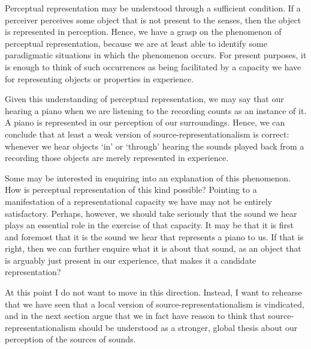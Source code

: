 \documentclass[sloppy, journal, git, bytitle, dodraft]{humapap}
\begin{document}

\sect Perceptual representation may be understood through a sufficient condition. If a perceiver perceives some object that is not present to the senses, then the object is represented in perception. Hence, we have a grasp on the phenomenon of perceptual representation, because we are at least able to identify some paradigmatic situations in which the phenomenon occurs. For present purposes, it is enough to think of such occurrences as being facilitated by a capacity we have for representing objects or properties in experience. 

Given this understanding of perceptual representation, we may say that our hearing a piano when we are listening to the recording counts as an instance of it. A piano is represented in our perception of our surroundings. Hence, we can conclude that at least a weak version of source-representationalism is correct: whenever we hear objects `in' or `through' hearing the sounds played back from a recording those objects are merely represented in experience. 

Some may be interested in enquiring into an explanation of this phenomenon. How is perceptual representation of this kind possible? Pointing to a manifestation of a representational capacity we have may not be entirely satisfactory. Perhaps, however, we should take seriously that the sound we hear plays an essential role in the exercise of that capacity. It may be that it is first and foremost that it is the sound we hear that represents a piano to us. If that is right, then we can further enquire what it is about that sound, as an object that is arguably just present in our experience, that makes it a candidate representation? 

At this point I do not want to move in this direction. Instead, I want to rehearse that we have seen that a local version of source-representationalism is vindicated, and in the next section argue that we in fact have reason to think that source-representationalism should be understood as a stronger, global thesis about our perception of the sources of sounds. 
\end{document}
